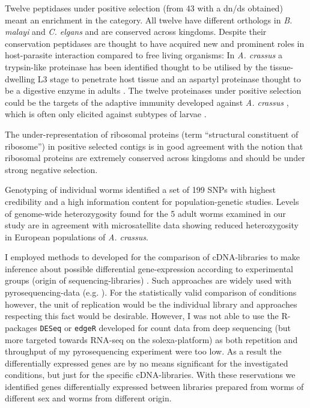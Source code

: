 Twelve peptidases under positive selection (from 43 with a dn/ds
obtained) meant an enrichment in the category. All twelve have different
orthologs in \textit{B. malayi} and \textit{C. elgans} and are
conserved across kingdoms. Despite their conservation peptidases are
thought to have acquired new and prominent roles in host-parasite
interaction compared to free living organisms: In \textit{A. crassus}
a trypsin-like proteinase has been identified thought to be utilised
by the tissue-dwelling L3 stage to penetrate host tissue and an
aspartyl proteinase thought to be a digestive enzyme in adults
\cite{polzer_identification_1993}. The twelve proteinases under positive
selection could be the targets of the adaptive immunity developed
against \textit{A. crassus} \cite{knopf_migratory_2008,
  knopf_vaccination_2008}, which is often only elicited against
subtypes of larvae \cite{molnar_caps}.

The under-representation of ribosomal proteins (term ``structural
constituent of ribosome'') in positive selected contigs is in good
agreement with the notion that ribosomal proteins are extremely
conserved across kingdoms \cite{pmid9664699} and should be under
strong negative selection.

Genotyping of individual worms identified a set of 199 SNPs with
highest credibility and a high information content for
population-genetic studies. Levels of genome-wide heterozygosity found
for the 5 adult worms examined in our study are in agreement with
microsatellite data \cite{wielgoss_population_2008} showing reduced
heterozygosity in European populations of \textit{A. crassus}.

I employed methods to developed for the comparison of cDNA-libraries
to make inference about possible differential gene-expression
according to experimental groups (origin of sequencing-libraries)
\cite{pmid9331369}. Such approaches are widely used with
pyrosequencing-data (e.g. \cite{pmid20470405}). For the statistically
valid comparison of conditions however, the unit of replication would
be the individual library and approaches respecting this fact would be
desirable. However, I was not able to use the R-packages
\texttt{DESeq} \cite{pmid20979621} or \texttt{edgeR}
\cite{pmid19910308} developed for count data from deep sequencing (but
more targeted towards RNA-seq on the solexa-platform) as both
repetition and throughput of my pyrosequencing experiment were too
low. As a result the differentially expressed genes are by no means
significant for the investigated conditions, but just for the specific
cDNA-libraries. With these reservations we identified genes
differentially expressed between libraries prepared from worms of
different sex and worms from different origin.

